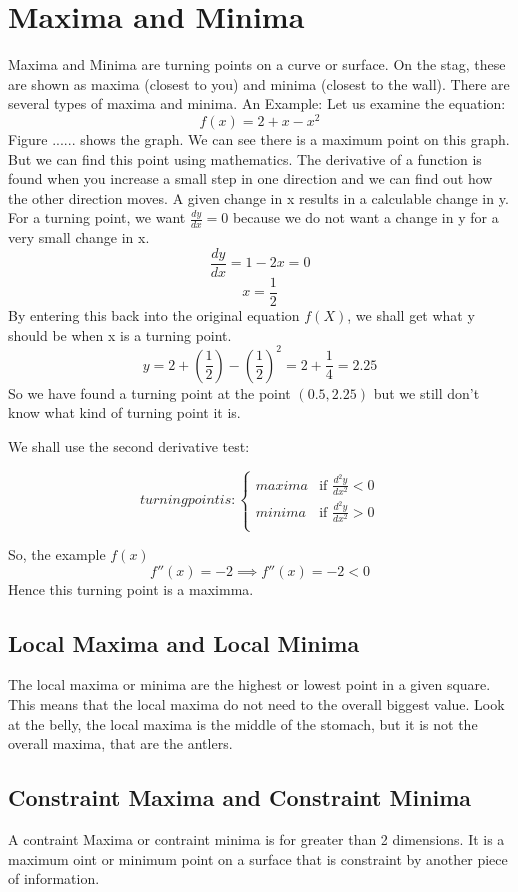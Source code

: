 \documentclass{article}
\begin{document}
\section{Maxima and Minima}
Maxima and Minima are turning points on a curve or surface. On the stag, these are shown as maxima (closest  to you) and minima (closest to the wall). 
There are several types of maxima and minima.
An Example:
Let us examine the equation:
$$ f(x) = 2+x-x^2 $$
Figure ...... shows the graph. We can see there is a maximum point on this graph. But we can find this point using mathematics.
The derivative of a function is found when you increase a small step in one direction and we can find out how the other direction moves.
A given change in x results in a calculable change in y. 
For a turning point, we want $\frac{dy}{dx} = 0$ because we do not want a change in y for a very small change in x.
$$ \frac{dy}{dx} = 1 -2x = 0 $$
$$ x = \frac{1}{2}$$
By entering this back into the original equation $f(X)$, we shall get what y should be when x is a turning point.
$$ y = 2+ (\frac{1}{2}) -(\frac{1}{2})^2  = 2+ \frac{1}{4} = 2.25 $$
So we have found a turning point at the point $(0.5,2.25)$ but we still don't know what kind of turning point it is.

We shall use the second derivative test:

\begin{equation}
    turning point is : 
    \left\{
	\begin{array}{ll}
		maxima  & \mbox{if } \frac{d^2y}{dx^2} < 0  \\
		minima & \mbox{if } \frac{d^2y}{dx^2} > 0 \\
	\end{array}
\right.
\end{equation}

So, the example $f(x)$ 
$$ f''(x) = - 2 \implies f''(x) = -2 < 0 $$
Hence this turning point is a maximma.


\subsection{Local Maxima and Local Minima}
The local maxima or minima are the highest or lowest point in a given square. This means that the local maxima do not need to the overall biggest value. Look at the belly, the local maxima is the middle of the stomach, but it is not the overall maxima, that are the antlers.


\subsection{Constraint Maxima and Constraint Minima}
A contraint Maxima or contraint minima is for greater than 2 dimensions. It is a maximum oint or minimum point on a surface that is constraint by another piece of information.
\end{document}
